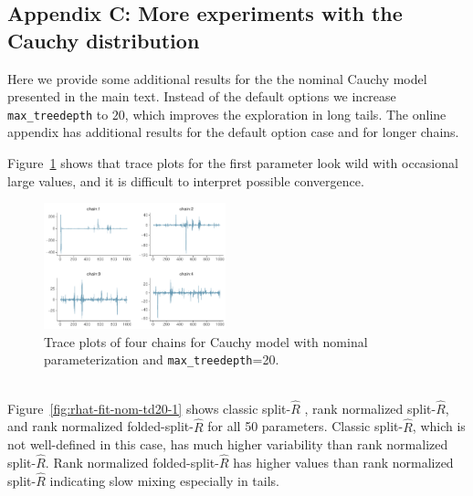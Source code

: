 \documentclass[american,]{article}
\theoremstyle{definition}
\begin{document}
\hypertarget{AppendixC}{%
\subsection*{Appendix C: More experiments with the Cauchy distribution}\label{AppendixE}}

Here we provide some additional results for the the nominal Cauchy
model presented in the main text. Instead of the default options we
increase \texttt{max\_treedepth} to \(20\), which improves the
exploration in long tails. The online appendix has additional results
for the default option case and for longer chains.


Figure~\ref{fig:trace-fit-nom-td20-1} shows that trace plots for the first
parameter look wild with occasional large values, and it is difficult
to interpret possible convergence.
\begin{figure}[tp]
  \centering
  \includegraphics[width=0.47\textwidth]{graphics/trace-fit-nom-td20-1.pdf}
  \caption{Trace plots of four chains for Cauchy model with nominal parameterization and \texttt{max\_treedepth}=20.\\~}
  \label{fig:trace-fit-nom-td20-1}
\end{figure}
%
Figure~\ref{fig:rhat-fit-nom-td20-1} shows classic split-\(\widehat{R}\) ,
rank normalized split-\(\widehat{R}\), and rank normalized
folded-split-\(\widehat{R}\) for all 50 parameters. Classic split-\(\widehat{R}\), which is
not well-defined in this case, has much higher variability than rank
normalized split-\(\widehat{R}\).  Rank normalized
folded-split-\(\widehat{R}\) has higher values than rank normalized
split-\(\widehat{R}\) indicating slow mixing especially in tails.
% 
\end{document}
